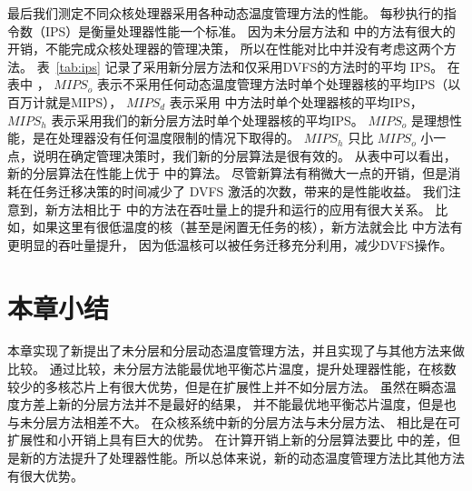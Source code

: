  
 最后我们测定不同众核处理器采用各种动态温度管理方法的性能。
 每秒执行的指令数（IPS）是衡量处理器性能一个标准。
 因为未分层方法和 \cite{Hanumaiah:TCAD'11} 中的方法有很大的开销，不能完成众核处理器的管理决策，
 所以在性能对比中并没有考虑这两个方法。
 表~\ref{tab:ips} 记录了采用新分层方法和仅采用DVFS的方法时的平均 IPS。
 在表中 ， $MIPS_o$ 表示不采用任何动态温度管理方法时单个处理器核的平均IPS（以百万计就是MIPS），
 $MIPS_d$ 表示采用 \cite{Zanini:ECCTD'09} 中方法时单个处理器核的平均IPS，
 $MIPS_h$ 表示采用我们的新分层方法时单个处理器核的平均IPS。
 $MIPS_o$ 是理想性能，是在处理器没有任何温度限制的情况下取得的。
  $MIPS_h$ 只比  $MIPS_o$ 小一点，说明在确定管理决策时，我们新的分层算法是很有效的。
  从表中可以看出，新的分层算法在性能上优于 \cite{Zanini:ECCTD'09} 中的算法。
  尽管新算法有稍微大一点的开销，但是消耗在任务迁移决策的时间减少了 DVFS 激活的次数，带来的是性能收益。
  我们注意到，新方法相比于 \cite{Zanini:ECCTD'09} 中的方法在吞吐量上的提升和运行的应用有很大关系。
  比如，如果这里有很低温度的核（甚至是闲置无任务的核），新方法就会比 \cite{Zanini:ECCTD'09} 中方法有更明显的吞吐量提升，
  因为低温核可以被任务迁移充分利用，减少DVFS操作。
  
 \section{本章小结}\label{sec:xiaojie6}
 
 本章实现了新提出了未分层和分层动态温度管理方法，并且实现了与其他方法来做比较。
 通过比较，未分层方法能最优地平衡芯片温度，提升处理器性能，在核数较少的多核芯片上有很大优势，但是在扩展性上并不如分层方法。
 虽然在瞬态温度方差上新的分层方法并不是最好的结果，
 并不能最优地平衡芯片温度，但是也与未分层方法相差不大。
 在众核系统中新的分层方法与未分层方法、 \cite{Hanumaiah:TCAD'11}相比是在可扩展性和小开销上具有巨大的优势。
 在计算开销上新的分层算法要比 \cite{Zanini:ECCTD'09} 中的差，但是新的方法提升了处理器性能。所以总体来说，新的动态温度管理方法比其他方法有很大优势。
 
 
 
 


























